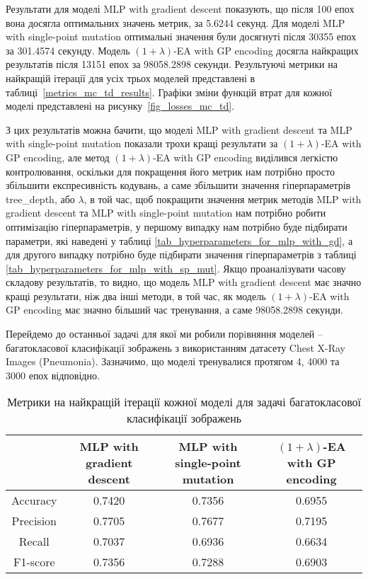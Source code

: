 Результати для моделі MLP with gradient descent показують, що після 100 епох вона досягла оптимальних значень метрик, за 5.6244 секунд. Для моделі MLP with single-point mutation оптимальні значення були досягнуті після 30355 епох за 301.4574 секунду. Модель $(1+\lambda)$-EA with GP encoding досягла найкращих результатів після 13151 епох за 98058.2898 секунди. Результуючі метрики на найкращій ітерації для усіх трьох моделей представлені в таблиці~\ref{metrics_mc_td_results}. Графіки зміни функцій втрат для кожної моделі представлені на рисунку~\ref{fig_losses_mc_td}.

З цих результатів можна бачити, що моделі MLP with gradient descent та MLP with single-point mutation показали трохи кращі результати за $(1+\lambda)$-EA with GP encoding, але метод $(1+\lambda)$-EA with GP encoding виділився легкістю контролювання, оскільки для покращення його метрик нам потрібно просто збільшити експресивність кодувань, а саме збільшити значення гіперпараметрів tree\_depth, або $\lambda$, в той час, щоб покращити значення метрик методів MLP with gradient descent та MLP with single-point mutation нам потрібно робити оптимізацію гіперпараметрів, у першому випадку нам потрібно буде підбирати параметри, які наведені у таблиці \ref{tab_hyperparameters_for_mlp_with_gd}, а для другого випадку потрібно буде підбирати значення гіперпараметрів з таблиці \ref{tab_hyperparameters_for_mlp_with_sp_mut}. Якщо проаналізувати часову складову результатів, то видно, що модель MLP with gradient descent має значно кращі результати, ніж два інші методи, в той час, як модель $(1+\lambda)$-EA with GP encoding має значно більший час тренування, а саме 98058.2898 секунди.

Перейдемо до останньої задачi для якої ми робили порiвняння моделей -- багатокласової класифiкацiї зображень з використанням датасету Chest X-Ray Images (Pneumonia). Зазначимо, що моделі тренувалися протягом 4, 4000 та 3000 епох відповідно. 

\begin{table}[ht]
	\centering
	\begin{adjustbox}{max width=\textwidth}
		\begin{tabular}{|c|c|c|c|}
			\hline 
			& MLP with gradient descent & MLP with single-point mutation & $(1+\lambda)$-EA with GP encoding \\
			\hline 
			Accuracy & 0.7420 & 0.7356 & 0.6955 \\
			\hline 
			Precision & 0.7705 & 0.7677 & 0.7195 \\
			\hline
			Recall & 0.7037 & 0.6936 & 0.6634 \\
			\hline
			F1-score & 0.7356 & 0.7288 & 0.6903 \\
			\hline
		\end{tabular}
	\end{adjustbox}
	\caption{Метрики на найкращій ітерації кожної моделі для задачі багатокласової класифікації зображень}
	\label{metrics_mc_id_results}
\end{table}

